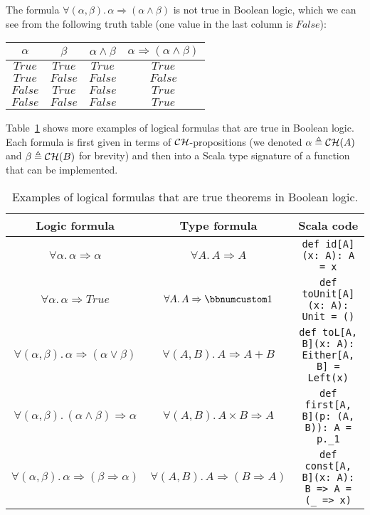 The formula $\forall(\alpha,\beta).\,\alpha\Rightarrow(\alpha\wedge\beta)$
is not true in Boolean logic, which we can see from the following
truth table (one value in the last column is $False$):
\begin{center}
{\small{}}%
\begin{tabular}{|c|c|c|c|}
\hline 
{\small{}$\alpha$} & {\small{}$\beta$} & \textbf{\small{}$\alpha\wedge\beta$} & {\small{}$\alpha\Rightarrow(\alpha\wedge\beta)$}\tabularnewline
\hline 
\hline 
{\small{}$True$} & {\small{}$True$} & {\small{}$True$} & {\small{}$True$}\tabularnewline
\hline 
{\small{}$True$} & {\small{}$False$} & {\small{}$False$} & {\small{}$False$}\tabularnewline
\hline 
{\small{}$False$} & {\small{}$True$} & {\small{}$False$} & {\small{}$True$}\tabularnewline
\hline 
{\small{}$False$} & {\small{}$False$} & {\small{}$False$} & {\small{}$True$}\tabularnewline
\hline 
\end{tabular}{\small\par}
\par\end{center}

Table~\ref{tab:Logical-formulas-Boolean-theorems} shows more examples
of logical formulas that are true in Boolean logic. Each formula is
first given in terms of ${\cal CH}$-propositions (we denoted $\alpha\triangleq{\cal CH}(A)$
and $\beta\triangleq{\cal CH}(B)$ for brevity) and then into a Scala
type signature of a function that can be implemented.

\begin{table}
\begin{centering}
\begin{tabular}{|c|c|c|}
\hline 
\textbf{\small{}Logic formula} & \textbf{\small{}Type formula} & \textbf{\small{}Scala code}\tabularnewline
\hline 
\hline 
{\footnotesize{}$\forall\alpha.\,\alpha\Rightarrow\alpha$} & {\footnotesize{}$\forall A.\,A\Rightarrow A$} & \lstinline!def id[A](x: A): A = x!\tabularnewline
\hline 
{\footnotesize{}$\forall\alpha.\,\alpha\Rightarrow True$} & {\footnotesize{}$\forall A.\,A\Rightarrow\bbnum 1$} & \lstinline!def toUnit[A](x: A): Unit = ()!\tabularnewline
\hline 
{\footnotesize{}$\forall(\alpha,\beta).\,\alpha\Rightarrow(\alpha\vee\beta)$} & {\footnotesize{}$\forall(A,B).\,A\Rightarrow A+B$} & \lstinline!def toL[A, B](x: A): Either[A, B] = Left(x)!\tabularnewline
\hline 
{\footnotesize{}$\forall(\alpha,\beta).\,(\alpha\wedge\beta)\Rightarrow\alpha$} & {\footnotesize{}$\forall(A,B).\,A\times B\Rightarrow A$} & \lstinline!def first[A, B](p: (A, B)): A = p._1!\tabularnewline
\hline 
{\footnotesize{}$\forall(\alpha,\beta).\,\alpha\Rightarrow(\beta\Rightarrow\alpha)$} & {\footnotesize{}$\forall(A,B).\,A\Rightarrow(B\Rightarrow A)$} & \lstinline!def const[A, B](x: A): B => A = (_ => x)!\tabularnewline
\hline 
\end{tabular}
\par\end{centering}
\caption{Examples of logical formulas that are true theorems in Boolean logic.\label{tab:Logical-formulas-Boolean-theorems}}
\end{table}

